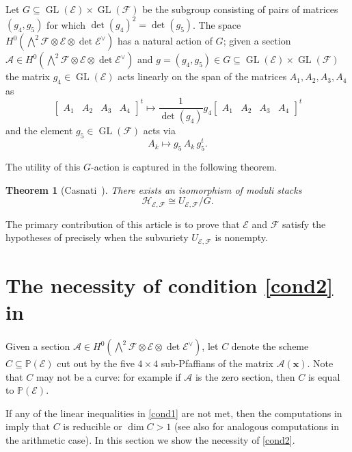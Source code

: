 \documentclass[11pt]{amsart}
\newtheorem{theorem}{Theorem}
\numberwithin{theorem}{section}
\numberwithin{equation}{section}
\theoremstyle{definition}\newtheorem{defn}[theorem]{Definition}
\theoremstyle{definition}\newtheorem{remark}[theorem]{Remark}
\theoremstyle{definition}\newtheorem{question}[theorem]{Question}
\theoremstyle{definition}\newtheorem{problem}[theorem]{Problem}
\newcommand{\PP}{\mathbb{P}}
\newcommand{\cE}{\mathcal{E}}
\newcommand{\cF}{\mathcal{F}}
\newcommand{\cA}{\mathcal{A}}
\newcommand{\cH}{\mathcal{H}}
\DeclareMathOperator{\GL}{GL}
\renewcommand{\subset}{\subseteq}
\begin{document}
Let $G \subset \GL(\cE) \times \GL(\cF)$ be the subgroup consisting of pairs of matrices $(g_4, g_5)$ for which $\det(g_4)^2 = \det(g_5)$. The space $H^0( \bigwedge\nolimits^2 \cF \otimes \cE \otimes \det \cE^{\vee} )$ has a natural action of $G$; given a section $\cA \in H^0( \bigwedge\nolimits^2 \cF \otimes \cE \otimes \det \cE^{\vee} )$ and $g = (g_4, g_5) \in G \subset \GL(\cE) \times \GL(\cF)$ the matrix $g_4 \in \GL(\cE)$ acts linearly on the span of the matrices $A_1, A_2, A_3, A_4$ as 
\[
\begin{bmatrix}
    A_1 & A_2 & A_3 & A_4  
\end{bmatrix}^t
\mapsto 
\frac{1}{\det(g_4)} g_4 
\begin{bmatrix}
  A_1 & A_2 & A_3 & A_4
\end{bmatrix}^t
\]
and the element $g_5 \in \GL(\cF)$ acts via 
\[
A_k \mapsto g_5 \, A_k \, g_5^t. 
\]

The utility of this $G$-action is captured in the following theorem.

\begin{theorem}[{Casnati~\cite[Theorem~1.1]{casnati}}]
    \label{prop:moduli-qunitic}
    There exists an isomorphism of moduli stacks
    \[
    \cH_{\cE, \cF} \cong U_{\cE,\cF}/ G.
    \]
\end{theorem}

The primary contribution of this article is to prove that $\cE$ and $\cF$ satisfy the hypotheses of  precisely when the subvariety $U_{\cE,\cF}$ is nonempty.

\section{The necessity of condition \texorpdfstring{\textnormal{\ref{cond2}} in }{(ii) in Theorem 1.5}}
\label{sec:necessity}
Given a section $\cA \in H^0( \bigwedge\nolimits^2 \cF \otimes \cE \otimes \det \cE^{\vee} )$, let $C$ denote the scheme $C \subset \PP(\cE)$ cut out by the five $4 \times 4$ sub-Pfaffians of the matrix $\cA(\mathbf{x})$. Note that $C$ may not be a curve: for example if $\cA$ is the zero section, then $C$ is equal to $\PP(\cE)$. 

If any of the linear inequalities in \ref{cond1} are not met, then the computations in \cite[Section~5]{CL} imply that $C$ is reducible or $\dim C > 1$ (see also \cite[Lemma~10]{B-quinticdiscs} for analogous computations in the arithmetic case). In this section we show the necessity of \ref{cond2}.
\end{document}
